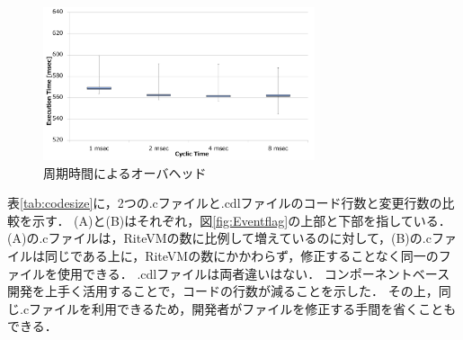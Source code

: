 \documentclass[submit,techrep]{ipsj}
\begin{document}

\begin{figure}[t]
    \centering
    \includegraphics[width=8cm,clip]{../EMSOFT2016/figure/comparison_msec.pdf}
    \vspace{-2mm}
    \caption{周期時間によるオーバヘッド}
\vspace{-3mm}
    \label{fig:comparison_msec}
\end{figure}

表\ref{tab:codesize}に，2つの.cファイルと.cdlファイルのコード行数と変更行数の比較を示す．
(A)と(B)はそれぞれ，図\ref{fig:Eventflag}の上部と下部を指している．
(A)の.cファイルは，RiteVMの数に比例して増えているのに対して，(B)の.cファイルは同じである上に，RiteVMの数にかかわらず，修正することなく同一のファイルを使用できる．
.cdlファイルは両者違いはない．
コンポーネントベース開発を上手く活用することで，コードの行数が減ることを示した．%
その上，同じ.cファイルを利用できるため，開発者がファイルを修正する手間を省くこともできる．

\end{document}
